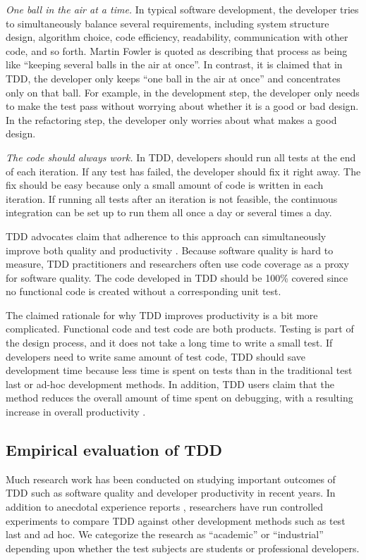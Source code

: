 \documentclass[smallextended]{svjour3}     %
\begin{document}
{\em One ball in the air at a time.}  In typical software development, the
developer tries to simultaneously balance several requirements, including
system structure design, algorithm choice, code efficiency, readability,
communication with other code, and so forth.  Martin Fowler is quoted as
describing that process as being like ``keeping several balls in the air at
once''.  In contrast, it is claimed that in TDD, the developer only keeps
``one ball in the air at once'' and concentrates only on that ball. For
example, in the development step, the developer only needs to make the test
pass without worrying about whether it is a good or bad design. In the
refactoring step, the developer only worries about what makes a good
design.

{\em The code should always work.} 
In TDD, developers should run 
all tests at the end of each iteration. If any test has failed, 
the developer should fix it right away. The fix should be easy because 
only a small amount of code is written in each iteration. If running 
all tests after an iteration is not feasible, the continuous 
integration can be set up to run them all once a day or several 
times a day. 

TDD advocates claim that adherence to this approach can simultaneously
improve both quality and productivity \citep{Beck:01,Janzen:05}.  Because
software quality is hard to measure, TDD practitioners and researchers
often use code coverage as a proxy for software quality. The code developed
in TDD should be 100\% covered since no functional code is created without
a corresponding unit test.

The claimed rationale for why TDD improves productivity is a bit more
complicated. Functional code and test code are both products. Testing is
part of the design process, and it does not take a long time to write a
small test. If developers need to write same amount of test code, TDD
should save development time because less time is spent on tests than in
the traditional test last or ad-hoc development methods. In addition, TDD
users claim that the method reduces the overall amount of time spent on
debugging, with a resulting increase in overall
productivity \citep{Williams:03}.

\subsection{Empirical evaluation of TDD}
\label{sec:related-empirical}

Much research work has been conducted on studying important outcomes of TDD
such as software quality and developer productivity in recent years. In
addition to anecdotal experience reports
\citep{George:04,Maximilien:03,Williams:03,Kaufmann:03,Edwards:04,Bhat:06},
researchers have run controlled experiments
\citep{Muller:02,Matjaz:03,Erdogmus:05} to compare TDD against other
development methods such as test last and ad hoc. We categorize the
research as ``academic'' or ``industrial'' depending upon whether the test
subjects are students or professional developers.
\end{document}

